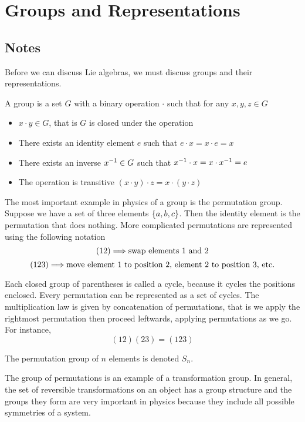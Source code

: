 \section{Groups and Representations}
\subsection{Notes}

Before we can discuss Lie algebras, we must discuss groups and their representations.

\begin{definition}[Groups]
	A group is a set $G$ with a binary operation $\cdot$ such that for any $x, y, z \in G$
	\begin{itemize}
		\item $x \cdot y \in G$, that is $G$ is closed under the operation
		\item There exists an identity element $e$ such that $e \cdot x = x \cdot e = x$
		\item There exists an inverse ${x}^{-1} \in G$ such that ${x}^{-1} \cdot x = x \cdot {x}^{-1} = e$
		\item The operation is transitive $(x \cdot y) \cdot z = x \cdot (y \cdot z)$
	\end{itemize}
\end{definition}
	
\begin{example}
	The most important example in physics of a group is the permutation group. Suppose we have a set of three elements $\left\{a,b,c\right\}$. Then the identity element is the permutation that does nothing. More complicated permutations are represented using the following notation
	\[ (12) \Longrightarrow \text{swap elements 1 and 2} \]
	\[ (123) \Longrightarrow \text{move element 1 to position 2, element 2 to position 3, etc.} \]
	
	Each closed group of parentheses is called a cycle, because it cycles the positions enclosed. Every permutation can be represented as a set of cycles. The multiplication law is given by concatenation of permutations, that is we apply the rightmost permutation then proceed leftwards, applying permutations as we go. For instance,
	\[ (12)(23) = (123) \]
	
	The permutation group of $n$ elements is denoted $S_n$.
\end{example}

The group of permutations is an example of a transformation group. In general, the set of reversible transformations on an object has a group structure and the groups they form are very important in physics because they include all possible symmetries of a system.

